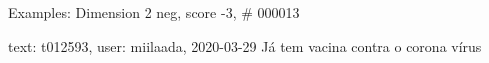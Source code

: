 \begin{frame}{Examples: Dimension 2 neg, score -3, \# 000013}
\footnotesize
\begin{alertblock}{text: t012593, user: miilaada, 2020-03-29}
Já tem vacina contra o corona vírus  
  
\end{alertblock}
\end{frame}

